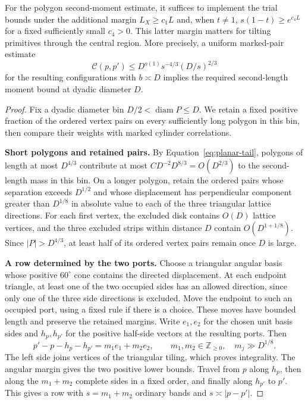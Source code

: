 \begin{lemma}\label{lem:07_magnetic_analysis-marks}
For the polygon second-moment estimate, it suffices to implement the trial bounds under the additional margin \(L_X\ge c_1 L\) and, when \(t\ne1\), \(s(1-t)\ge e^{c_4 L}\) for a fixed sufficiently small \(c_4>0\). This latter margin matters for tilting primitives through the central region. More precisely, a uniform marked-pair estimate
\[ \mathcal C(p,p')\le D^{o(1)}s^{-4/3}(D/s)^{2/3} \]
for the resulting configurations with \(b\asymp D\) implies the required
second-length moment bound at dyadic diameter \(D\).
\end{lemma}
\begin{proof}
Fix a dyadic diameter bin $D/2<\operatorname{diam}P\le D$. We
retain a fixed positive fraction of the ordered vertex pairs on every
sufficiently long polygon in this bin, then compare their weights with
marked cylinder correlations.

\par\smallskip\noindent\textbf{Short polygons and retained pairs.}
By Equation~\eqref{eq:planar-tail}, polygons of length at most
$D^{4/3}$ contribute at most
$CD^{-2}D^{8/3}=O(D^{2/3})$ to the second-length mass in this bin.
On a longer polygon, retain the ordered pairs whose separation exceeds
$D^{1/2}$ and whose displacement has perpendicular component greater
than $D^{1/8}$ in absolute value to each of the three triangular
lattice directions. For each first vertex, the excluded disk contains
$O(D)$ lattice vertices, and the three excluded strips within distance
$D$ contain $O(D^{1+1/8})$. Since $|P|>D^{4/3}$, at least half of
its ordered vertex pairs remain once $D$ is large.

\par\smallskip\noindent\textbf{A row determined by the two ports.}
Choose a triangular angular basis whose positive $60^\circ$ cone
contains the directed displacement. At each endpoint triangle, at
least one of the two occupied sides has an allowed direction, since
only one of the three side directions is excluded. Move the endpoint
to such an occupied port, using a fixed rule if there is a choice.
These moves have bounded length and preserve the retained margins.
Write $e_1,e_2$ for the chosen unit basis sides and $h_p,h_{p'}$ for
the positive half-side vectors at the resulting ports. Then
\[
 p'-p-h_p-h_{p'}=m_1e_1+m_2e_2,\qquad
 m_1,m_2\in\mathbb Z_{\ge0},\quad m_j\gg D^{1/8}.
\]
The left side joins vertices of the triangular tiling, which proves
integrality. The angular margin gives the two positive lower bounds.
Travel from $p$ along $h_p$, then along the $m_1+m_2$ complete sides
in a fixed order, and finally along $h_{p'}$ to $p'$. This gives a
row with $s=m_1+m_2$ ordinary bands and
$s\asymp|p-p'|$.


\end{proof}
